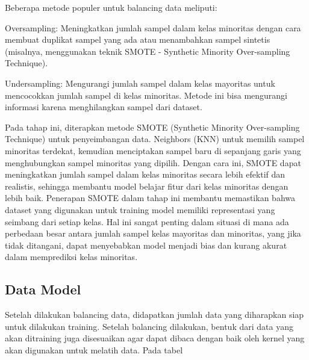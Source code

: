 Beberapa metode populer untuk balancing data meliputi:

Oversampling: Meningkatkan jumlah sampel dalam kelas minoritas dengan cara membuat duplikat sampel yang ada atau menambahkan sampel sintetis (misalnya, menggunakan teknik SMOTE - Synthetic Minority Over-sampling Technique).

Undersampling: Mengurangi jumlah sampel dalam kelas mayoritas untuk mencocokkan jumlah sampel di kelas minoritas. Metode ini bisa mengurangi informasi karena menghilangkan sampel dari dataset.

Pada tahap ini, diterapkan metode SMOTE (Synthetic Minority Over-sampling Technique) untuk penyeimbangan data.  Neighbors (KNN) untuk memilih sampel minoritas terdekat, kemudian menciptakan sampel baru di sepanjang garis yang menghubungkan sampel minoritas yang dipilih. Dengan cara ini, SMOTE dapat meningkatkan jumlah sampel dalam kelas minoritas secara lebih efektif dan realistis, sehingga membantu model belajar fitur dari kelas minoritas dengan lebih baik. Penerapan SMOTE dalam tahap ini membantu memastikan bahwa dataset yang digunakan untuk training model memiliki representasi yang seimbang dari setiap kelas. Hal ini sangat penting dalam situasi di mana ada perbedaan besar antara jumlah sampel kelas mayoritas dan minoritas, yang jika tidak ditangani, dapat menyebabkan model menjadi bias dan kurang akurat dalam memprediksi kelas minoritas.

\subsection{Data Model}
\label{subsec:datamodel}

Setelah dilakukan balancing data, didapatkan jumlah data yang diharapkan siap untuk dilakukan training. Setelah balancing dilakukan, bentuk dari data yang akan ditraining juga disesuaikan agar dapat dibaca dengan baik oleh kernel yang akan digunakan untuk melatih data. Pada tabel

